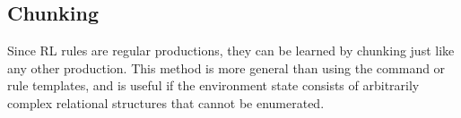 \subsection{Chunking}
Since RL rules are regular productions, they can be learned by chunking just like any other production.
This method is more general than using the  command or rule templates, and is useful if the environment state consists of arbitrarily complex relational structures that cannot be enumerated.
